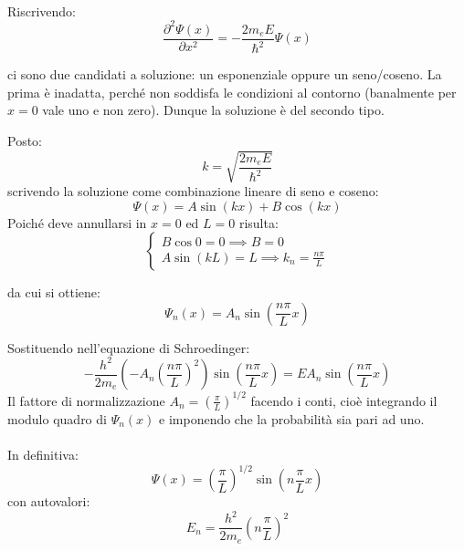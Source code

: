 \documentclass{book}
\begin{document}
            \paragraph{}
                Riscrivendo:
                $$\frac{\partial ^{2}\Psi(x)}{\partial x^{2}} = - \frac{2m_{e}E}{\hbar ^{2}} \Psi(x)$$

                ci sono due candidati a soluzione: un esponenziale oppure un seno/coseno. La prima è inadatta, perché non soddisfa le condizioni al contorno (banalmente per $x=0$ vale uno e non zero). Dunque la soluzione è del secondo tipo. \newline
               
                Posto:
                $$k = \sqrt{\frac{2m_{e}E}{\hbar ^{2}}}$$
                scrivendo la soluzione come combinazione lineare di seno e coseno:
                $$\Psi(x) = A \sin(kx) + B\cos(kx)$$
                Poiché deve annullarsi in $x=0$ ed $L=0$ risulta:
                $$\begin{cases}
                    B\cos{0} = 0 \implies B = 0 \\
                    A\sin(kL) = L \implies k_{n} = \displaystyle \frac{n\pi}{L} 
                \end{cases}$$

                da cui si ottiene:
                $$\Psi_{n}(x) = A_{n} \sin(\frac{n \pi}{L} x)$$

                Sostituendo nell'equazione di Schroedinger:
                $$-\frac{h^{2}}{2m_{e}}(-A_{n}(\frac{n\pi}{L})^{2})\sin(\frac{n \pi}{L}x) = EA_{n}\sin(\frac{n \pi}{L} x)$$
                Il fattore di normalizzazione $A_{n} = (\frac{\pi}{L})^{1/2}$ facendo i conti, cioè integrando il modulo quadro di $\Psi_{n}(x)$ e imponendo che la probabilità sia pari ad uno.

            \paragraph{}
                In definitiva:
                $$\Psi(x) = (\frac{\pi}{L})^{1/2} \sin(n \frac{\pi}{L} x)$$
                con autovalori:
                $$E_{n} = \frac{h^{2}}{2m_{e}}( n\frac{\pi}{L})^{2}$$

            \newpage
\end{document}
